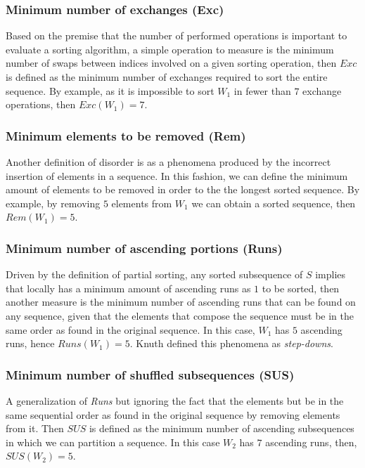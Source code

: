 \subsubsection{Minimum number of exchanges (Exc)}
Based on the premise that the number of performed operations is important to evaluate a sorting algorithm, a simple operation to measure is the minimum number of swaps between indices involved on a given sorting operation, then $Exc$ is defined as the minimum number of exchanges required to sort the entire sequence\cite{Mannila_1985}. By example, as it is impossible to sort $W_1$ in fewer than $7$ exchange operations, then $Exc(W_1)=7$.

\subsubsection{Minimum elements to be removed (Rem)}
Another definition of disorder is as a phenomena produced by the incorrect insertion of elements in a sequence\cite{10.5555/270146}. In this fashion, we can define the minimum amount of elements to be removed in order to the the longest sorted sequence. By example, by removing $5$ elements from $W_1$ we can obtain a sorted sequence, then $Rem(W_1) = 5$.

\subsubsection{Minimum number of ascending portions (Runs)}
Driven by the definition of partial sorting\cite{10.5555/1614191}, any sorted subsequence of $S$ implies that locally has a minimum amount of ascending runs as $1$ to be sorted, then another measure is the minimum number of ascending runs that can be found on any sequence, given that the elements that compose the sequence must be in the same order as found in the original sequence. In this case, $W_1$ has $5$ ascending runs, hence $Runs(W_1) =5$. Knuth defined this phenomena as \textit{step-downs}\cite{10.5555/270146}.

\subsubsection{Minimum number of shuffled subsequences (SUS)}
A generalization of \textit{Runs} but ignoring the fact that the elements but be in the same sequential order as found in the original sequence by removing elements from it. Then $SUS$ is defined as the minimum number of ascending subsequences in which we can partition a sequence\cite{Carlsson_Levcopoulos_Petersson_1993}. In this case $W_2$ has $7$ ascending runs, then, $SUS(W_2) = 5$.


